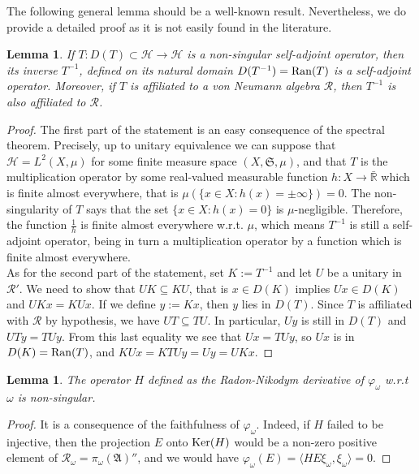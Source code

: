 \documentclass[12pt]{amsart}
\numberwithin{equation}{section}
\def\ch{{\mathcal H}}
\def\ga{{\mathfrak A}} \def\gpa{{\mathfrak a}}
\def\om{\omega} \def\Om{\Omega}
\newtheorem{lem}[thm]{Lemma}
\theoremstyle{definition}
\begin{document}
The following general lemma should be a well-known result. Nevertheless, we do provide a detailed proof as it is not easily found in the literature.

\begin{lem}
\label{lem:affiliation}
If $T: D(T)\subset \ch\rightarrow\ch$ is a non-singular self-adjoint operator, then its inverse
$T^{-1}$, defined on its natural domain $D(T^{-1})={\rm Ran}(T)$ is a self-adjoint operator.
Moreover, if $T$ is affiliated to a von Neumann algebra $\mathcal{R}$, then $T^{-1}$ is also
affiliated to $\mathcal{R}$.
\end{lem}

\begin{proof}
The first part of the statement is an easy consequence of the spectral theorem. Precisely, up to unitary
equivalence we can suppose that $\ch= L^2(X, \mu)$ for some finite measure space $(X, \mathfrak{S}, \mu)$, and
that $T$ is the multiplication operator by some real-valued measurable function $h: X\rightarrow \bar{\mathbb{R}}$ which is finite almost everywhere, that is $\mu(\{x\in X: h(x)=\pm \infty\})=0$. The non-singularity of $T$ says that the set $\{x\in X: h(x)=0\}$ is $\mu$-negligible. Therefore, the function $\frac{1}{h}$ is finite almost everywhere w.r.t. $\mu$, which means $T^{-1}$ is still a self-adjoint operator, being in turn a multiplication operator
by a function which is finite almost everywhere.\\
As for the second part of the statement, set $K:=T^{-1}$ and let $U$ be a unitary in $\mathcal{R}'$. We need to show that
$UK\subseteq KU$, that is $x\in D(K)$ implies $Ux\in D(K)$ and $UKx =KUx$. If we define $y:=Kx$, then
$y$ lies in $D(T)$. Since $T$ is affiliated with $\mathcal{R}$ by hypothesis, we have $UT\subseteq TU$. In particular,
$Uy$ is still in $D(T)$ and $UTy =TUy$. From this last equality we see that $Ux=TUy$, so $Ux$ is in 
$D(K)={\rm Ran}(T)$, and $KUx=KTUy=Uy=UKx$.
\end{proof}

\begin{lem}
\label{lem:nonsingular}
The operator $H$ defined as the Radon-Nikodym derivative of $\varphi_\om$ w.r.t $\om$ is non-singular.
\end{lem}

\begin{proof}
It is a consequence of the faithfulness of $\varphi_\om$. Indeed, if $H$ failed to be injective, then the projection
$E$ onto ${\rm Ker}(H)$ would be a non-zero positive element of $\mathcal{R}_\om= \pi_\om(\ga)''$, and we would have
$\varphi_\om(E)=\langle HE\xi_\om,\xi_\om \rangle=0$.
\end{proof}
\end{document}
